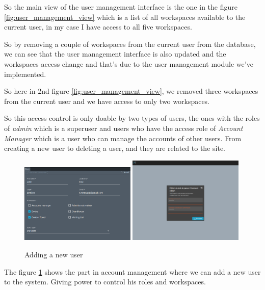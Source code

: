 So the main view of the user management interface is the one in the figure
\ref{fig:user_management_view} which is a list of all workspaces available to the current
user, in my case I have access to all five workspaces.

So by removing a couple of workspaces from the current user from the database,
we can see that the user management interface is also updated and the workspaces
access change and that's due to the user management module we've implemented.

So here in 2nd figure \ref{fig:user_management_view}, we removed three workspaces from
the current user and we have access to only two workspaces.

So this access control is only doable by two types of users, the ones with the roles
of \textit{admin} which is a superuser and users who have the access role of
\textit{Account Manager} which is a user who can manage the accounts of other users.
From creating a new user to deleting a user, and they are related to the site.

\begin{figure}[!ht]
    \centering
    \includegraphics[width=0.49\textwidth]{images/insertingANewUser}
    \hfill
    \includegraphics[width=0.49\textwidth]{images/password}
    \caption{Adding a new user}
    \label{fig:insert_user}
\end{figure}

The figure \ref{fig:insert_user} shows the part in account management where we can add
a new user to the system. Giving power to control his roles and workspaces.

